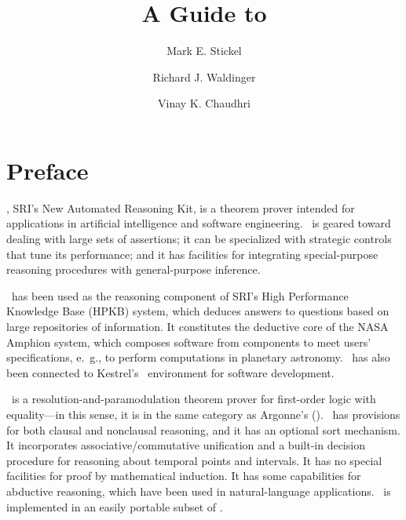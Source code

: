 \title{A Guide to \Snark}
\author{Mark E. Stickel \and
	Richard J. Waldinger \and
        Vinay K. Chaudhri }

\maketitle
\tableofcontents
\mbox{}
\newpage
\section{Preface}
\label{sec-preface}
 \Snark\/, SRI's New Automated Reasoning Kit, is a theorem prover
 intended for applications in artificial intelligence and software
 engineering.  \Snark\  is geared toward dealing with large sets of
 assertions; it can be specialized with strategic controls that tune
 its performance; and it has facilities for integrating
 special-purpose reasoning procedures with general-purpose inference.

 \Snark\  has been used as the reasoning component of SRI's High
 Performance Knowledge Base (HPKB) system, which deduces answers to
 questions based on large repositories of information.  It constitutes
 the deductive core of the NASA Amphion system, which composes
 software from components to meet users' specifications, e.\ g., to
 perform computations in planetary astronomy.  \Snark\  has also been
 connected to Kestrel's \specware\  environment for software
 development.

\Snark\  is a resolution-and-paramodulation theorem prover for
first-order logic with equality---in this sense, it is in the same
category as Argonne's \otter\/ (\cite{otter}).
\Snark\  has provisions for both clausal and nonclausal reasoning, and
it has an optional sort mechanism.  It incorporates associative/commutative
unification and a built-in decision procedure for reasoning about temporal
points and intervals.  It has no special facilities for proof by mathematical
induction.  It has some capabilities for abductive reasoning, which have been
used in natural-language applications.
\Snark\  is implemented in an easily portable subset of \commonlisp\/.


